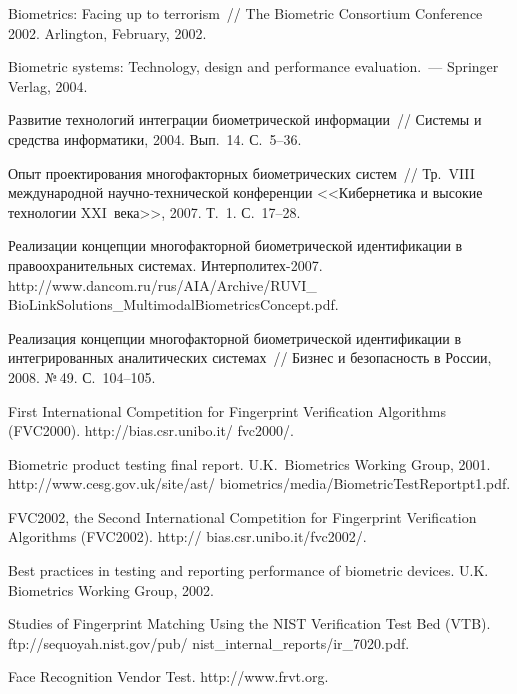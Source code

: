 \begin{multicols}{2}
{{\begin{thebibliography}{99}
Biometrics: Facing up to terrorism~// The Biometric Consortium Conference 
2002.  Arlington, February, 2002.

Biometric systems: Technology, design and performance evaluation.~--- 
Springer Verlag, 2004.

Развитие технологий интеграции биометрической информации~// 
Системы и средства информатики, 2004. Вып.~14. С.~5--36.

Опыт проектирования многофакторных биометрических систем~// Тр.\ 
VIII международной научно-технической конференции <<Кибернетика и 
высокие технологии XXI~века>>, 2007.  Т.~1. С.~17--28.

Реализации концепции многофакторной биометрической идентификации 
в правоохранительных системах. Ин\-тер\-по\-ли\-тех-2007.  
{\sf  
http://www.dancom.ru/rus/AIA/Archive/RUVI\_ BioLinkSolutions\_MultimodalBiometricsConcept.pdf}.

Реализация концепции многофакторной биометрической идентификации 
в интегрированных аналитических системах~// Бизнес и безопасность в 
России,  2008. №\,49. С.~104--105.


First International Competition for Fingerprint Verification Algorithms 
(FVC2000). {\sf  http://bias.csr.unibo.it/ fvc2000/}.

Biometric product testing final report. U.K.\ Biometrics Working Group, 2001. 
{\sf 
http://www.cesg.gov.uk/site/ast/ \mbox{biometrics/media/BiometricTestReportpt1.pdf}}.

FVC2002, the Second International Competition for Fingerprint Verification 
Algorithms (FVC2002). {\sf http:// bias.csr.unibo.it/fvc2002/}.

Best practices in testing and reporting performance of biometric devices. U.K. 
Biometrics Working Group, 2002. 

Studies of Fingerprint Matching Using the NIST Verification Test Bed (VTB).  
{\sf  ftp://sequoyah.nist.gov/pub/ nist\_internal\_reports/ir\_7020.pdf}.

Face Recognition Vendor Test. {\sf  http://www.frvt.org}.


\end{thebibliography}}}
\end{multicols}
